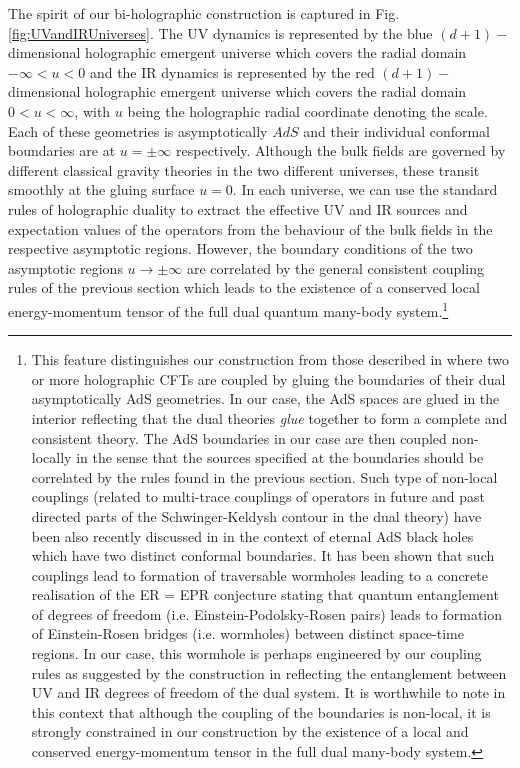 \documentclass[prd,reprint,a4paper,showpacs,superscriptaddress,11pt,onecolumn,nofootinbib]{revtex4-1}
\renewcommand{\(}{\left(}
\renewcommand{\)}{\right)}
\newcommand{\6}{\partial}
\begin{document}
The spirit of our bi-holographic construction is captured in Fig. \ref{fig:UVandIRUniverses}. The UV dynamics is represented by the blue $(d+1)-$dimensional holographic emergent universe which covers the radial domain $-\infty < u <0$ and the IR dynamics is represented by the red $(d+1)-$dimensional holographic emergent universe which covers the radial domain $0 <u < \infty$, with $u$ being the holographic radial coordinate denoting the scale. Each of these geometries is asymptotically $AdS$ and their individual conformal boundaries are at $u= \pm \infty$ respectively. Although the bulk fields are governed by different classical gravity theories in the two different universes, these transit smoothly at the gluing surface $u= 0$. In each universe, we can use the standard rules of holographic duality \cite{Maldacena:1997re,Gubser:1998bc,Witten:1998qj} to extract the effective UV and IR sources and expectation values of the operators from the behaviour of the bulk fields in the respective asymptotic regions. However, the boundary conditions of the two asymptotic regions $u \rightarrow \pm \infty$ are correlated by the general consistent coupling rules of the previous section which leads to the existence of a conserved local energy-momentum tensor of the full dual quantum many-body system.\footnote{This feature distinguishes our construction from those described in \cite{Aharony:2006hz,Kiritsis:2006hy,Kiritsis:2008at} where two or more holographic CFTs are coupled by gluing the boundaries of their dual asymptotically AdS geometries. In our case, the AdS spaces are glued in the interior reflecting that the dual theories \textit{glue} together to form a complete and consistent theory. The AdS boundaries in our case are then coupled non-locally in the sense that the sources specified at the boundaries should be correlated by the rules found in the previous section. Such type of non-local couplings (related to multi-trace couplings of operators in future and past directed parts of the Schwinger-Keldysh contour in the dual theory) have been also recently discussed in \cite{Gao:2016bin} in the context of eternal AdS black holes which have two distinct conformal boundaries. It has been shown that such couplings lead to formation of traversable wormholes leading to a concrete realisation of the ER = EPR conjecture \cite{Maldacena:2013xja} stating that quantum entanglement of degrees of freedom (i.e. Einstein-Podolsky-Rosen pairs) leads to formation of Einstein-Rosen bridges (i.e. wormholes) between distinct space-time regions. In our case, this wormhole is perhaps engineered by our coupling rules as suggested by the construction in \cite{Gao:2016bin} reflecting the entanglement between UV and IR degrees of freedom of the dual system. It is worthwhile to note in this context that although the coupling of the boundaries is non-local,  it is strongly constrained in our construction by the existence of a local and conserved energy-momentum tensor in the full dual many-body system.} 
\end{document}
